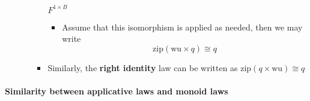 \begin{itemize}
\begin{itemize}
\begin{itemize}
$F^{1\times B}$
\begin{itemize}
\item Assume that this isomorphism is applied as needed, then we may write{\footnotesize{}
\[
\text{zip}\left(\text{wu}\times q\right)\cong q
\]
}{\footnotesize\par}
\end{itemize}
\item Similarly, the \textbf{right identity} law can be written as {\footnotesize{}$\text{zip}\left(q\times\text{wu}\right)\cong q$}{\footnotesize\par}
\end{itemize}
\end{itemize}
\end{itemize}


\paragraph{Similarity between applicative laws and monoid laws}
